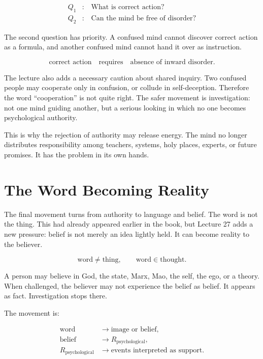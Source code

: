 \documentclass[11pt,oneside]{book}
\begin{document}
\begin{align}
Q_1 &: \quad \text{What is correct action?}\\
Q_2 &: \quad \text{Can the mind be free of disorder?}
\end{align}

The second question has priority. A confused mind cannot discover correct action as a formula, and another confused mind cannot hand it over as instruction.

\begin{equation}
\text{correct action}
\quad \text{requires} \quad
\text{absence of inward disorder}.
\end{equation}

The lecture also adds a necessary caution about shared inquiry. Two confused people may cooperate only in confusion, or collude in self-deception. Therefore the word ``cooperation'' is not quite right. The safer movement is investigation: not one mind guiding another, but a serious looking in which no one becomes psychological authority.

This is why the rejection of authority may release energy. The mind no longer distributes responsibility among teachers, systems, holy places, experts, or future promises. It has the problem in its own hands.

\section{The Word Becoming Reality}

The final movement turns from authority to language and belief. The word is not the thing. This had already appeared earlier in the book, but Lecture 27 adds a new pressure: belief is not merely an idea lightly held. It can become reality to the believer.

\begin{equation}
\text{word} \neq \text{thing},
\qquad
\text{word} \in \text{thought}.
\end{equation}

A person may believe in God, the state, Marx, Mao, the self, the ego, or a theory. When challenged, the believer may not experience the belief as belief. It appears as fact. Investigation stops there.

The movement is:

\begin{align}
\text{word} &\longrightarrow \text{image or belief},\\
\text{belief} &\longrightarrow R_{\mathrm{psychological}},\\
R_{\mathrm{psychological}} &\longrightarrow \text{events interpreted as support}.
\end{align}
\end{document}
